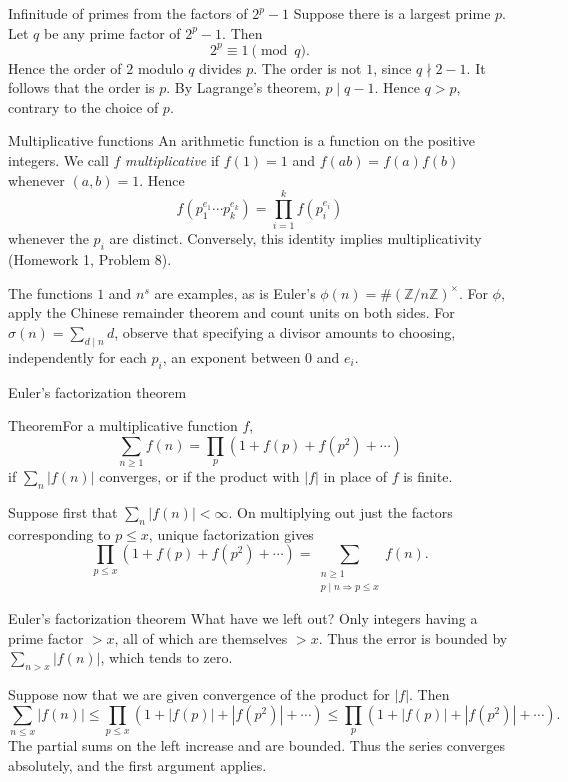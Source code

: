 \documentclass[aspectratio=169,11pt]{beamer}
\newcommand{\Z}{\mathbb Z}
\begin{document}
\begin{frame}{Infinitude of primes from the factors of $2^p-1$}
Suppose there is a largest prime $p$. Let $q$ be any prime factor of $2^p-1$. Then
\[2^p\equiv1\pmod q.\]
Hence the order of $2$ modulo $q$ divides $p$. The order is not $1$, since $q\nmid2-1$. It follows that the order is $p$. By Lagrange's theorem, $p\mid q-1$. Hence $q>p$, contrary to the choice of $p$.
\end{frame}
\begin{frame}{Multiplicative functions}
An arithmetic function is a function on the positive integers. We call $f$ \emph{multiplicative} if $f(1)=1$ and $f(ab)=f(a)f(b)$ whenever $(a,b)=1$. Hence
\[f(p_1^{e_1}\cdots p_k^{e_k})=\prod_{i=1}^k f(p_i^{e_i})\]
whenever the $p_i$ are distinct. Conversely, this identity implies multiplicativity (Homework 1, Problem 8).

The functions $1$ and $n^s$ are examples, as is Euler's $\phi(n)=\#(\Z/n\Z)^\times$. For $\phi$, apply the Chinese remainder theorem and count units on both sides. For $\sigma(n)=\sum_{d\mid n}d$, observe that specifying a divisor amounts to choosing, independently for each $p_i$, an exponent between $0$ and $e_i$.
\end{frame}
\begin{frame}{Euler's factorization theorem}
\begin{block}{Theorem}For a multiplicative function $f$,
\[\sum_{n\ge1}f(n)=\prod_p(1+f(p)+f(p^2)+\cdots)\]
if $\sum_n|f(n)|$ converges, or if the product with $|f|$ in place of $f$ is finite.
\end{block}
Suppose first that $\sum_n|f(n)|<\infty$. On multiplying out just the factors corresponding to $p\le x$, unique factorization gives
\[\prod_{p\le x}(1+f(p)+f(p^2)+\cdots)=\sum_{\substack{n\ge1\\p\mid n\Rightarrow p\le x}}f(n).\]
\end{frame}
\begin{frame}{Euler's factorization theorem}
What have we left out? Only integers having a prime factor $>x$, all of which are themselves $>x$. Thus the error is bounded by $\sum_{n>x}|f(n)|$, which tends to zero.

Suppose now that we are given convergence of the product for $|f|$. Then
\[\sum_{n\le x}|f(n)|\le\prod_{p\le x}(1+|f(p)|+|f(p^2)|+\cdots)\le\prod_p(1+|f(p)|+|f(p^2)|+\cdots).\]
The partial sums on the left increase and are bounded. Thus the series converges absolutely, and the first argument applies.
\end{frame}
\end{document}
